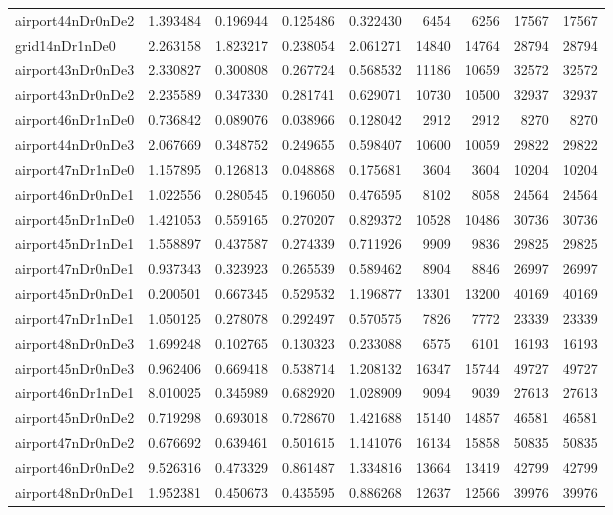 \begin{longtable}{|l|r|r|r|r|r|r|r|r|}
airport44nDr0nDe2 & 1.393484 & 0.196944 & 0.125486 & 0.322430 & 6454 & 6256 & 17567 & 17567 \\
grid14nDr1nDe0 & 2.263158 & 1.823217 & 0.238054 & 2.061271 & 14840 & 14764 & 28794 & 28794 \\
airport43nDr0nDe3 & 2.330827 & 0.300808 & 0.267724 & 0.568532 & 11186 & 10659 & 32572 & 32572 \\
airport43nDr0nDe2 & 2.235589 & 0.347330 & 0.281741 & 0.629071 & 10730 & 10500 & 32937 & 32937 \\
airport46nDr1nDe0 & 0.736842 & 0.089076 & 0.038966 & 0.128042 & 2912 & 2912 & 8270 & 8270 \\
airport44nDr0nDe3 & 2.067669 & 0.348752 & 0.249655 & 0.598407 & 10600 & 10059 & 29822 & 29822 \\
airport47nDr1nDe0 & 1.157895 & 0.126813 & 0.048868 & 0.175681 & 3604 & 3604 & 10204 & 10204 \\
airport46nDr0nDe1 & 1.022556 & 0.280545 & 0.196050 & 0.476595 & 8102 & 8058 & 24564 & 24564 \\
airport45nDr1nDe0 & 1.421053 & 0.559165 & 0.270207 & 0.829372 & 10528 & 10486 & 30736 & 30736 \\
airport45nDr1nDe1 & 1.558897 & 0.437587 & 0.274339 & 0.711926 & 9909 & 9836 & 29825 & 29825 \\
airport47nDr0nDe1 & 0.937343 & 0.323923 & 0.265539 & 0.589462 & 8904 & 8846 & 26997 & 26997 \\
airport45nDr0nDe1 & 0.200501 & 0.667345 & 0.529532 & 1.196877 & 13301 & 13200 & 40169 & 40169 \\
airport47nDr1nDe1 & 1.050125 & 0.278078 & 0.292497 & 0.570575 & 7826 & 7772 & 23339 & 23339 \\
airport48nDr0nDe3 & 1.699248 & 0.102765 & 0.130323 & 0.233088 & 6575 & 6101 & 16193 & 16193 \\
airport45nDr0nDe3 & 0.962406 & 0.669418 & 0.538714 & 1.208132 & 16347 & 15744 & 49727 & 49727 \\
airport46nDr1nDe1 & 8.010025 & 0.345989 & 0.682920 & 1.028909 & 9094 & 9039 & 27613 & 27613 \\
airport45nDr0nDe2 & 0.719298 & 0.693018 & 0.728670 & 1.421688 & 15140 & 14857 & 46581 & 46581 \\
airport47nDr0nDe2 & 0.676692 & 0.639461 & 0.501615 & 1.141076 & 16134 & 15858 & 50835 & 50835 \\
airport46nDr0nDe2 & 9.526316 & 0.473329 & 0.861487 & 1.334816 & 13664 & 13419 & 42799 & 42799 \\
airport48nDr0nDe1 & 1.952381 & 0.450673 & 0.435595 & 0.886268 & 12637 & 12566 & 39976 & 39976 \\

\end{longtable}
